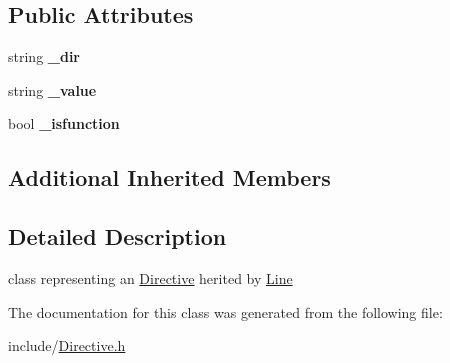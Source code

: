 \subsection*{Public Attributes}
\begin{DoxyCompactItemize}
\item 
\mbox{\label{class_directive_a3e89203d14d83c6ff8da7a1c49b9a60e}} 
string {\bfseries \+\_\+dir}
\item 
\mbox{\label{class_directive_aaeaa71135c6d434d58db763a1e2b70e3}} 
string {\bfseries \+\_\+value}
\item 
\mbox{\label{class_directive_ae9e02b1ecc6a1b5387f5227959984c1f}} 
bool {\bfseries \+\_\+isfunction}
\end{DoxyCompactItemize}
\subsection*{Additional Inherited Members}


\subsection{Detailed Description}
class representing an \mbox{\hyperlink{class_directive}{Directive}} herited by \mbox{\hyperlink{class_line}{Line}} 

The documentation for this class was generated from the following file\+:\begin{DoxyCompactItemize}
\item 
include/\mbox{\hyperlink{_directive_8h}{Directive.\+h}}\end{DoxyCompactItemize}
